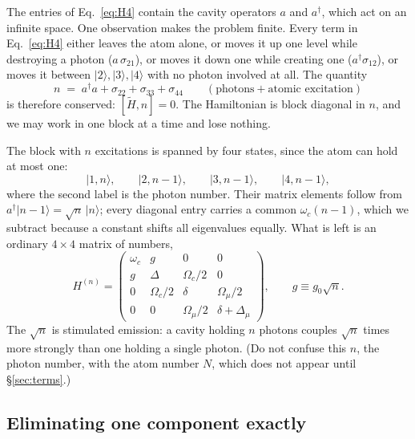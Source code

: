 \documentclass[11pt,a4paper]{article}
\newcommand{\ket}[1]{\lvert #1 \rangle}
\newcommand{\dg}{^{\dagger}}
\newcommand{\Om}{\Omega}
\newcommand{\Omu}{\Omega_{\mu}}
\newcommand{\Dmu}{\Delta_{\mu}}
\begin{document}
The entries of Eq.~\eqref{eq:H4} contain the cavity operators $a$ and $a\dg$, which act on an
infinite space. One observation makes the problem finite. Every term in Eq.~\eqref{eq:H4}
either leaves the atom alone, or moves it up one level while destroying a photon
($a\,\sigma_{21}$), or moves it down one while creating one ($a\dg\sigma_{12}$), or moves it
between $\ket{2},\ket{3},\ket{4}$ with no photon involved at all. The quantity
\begin{equation}
  n \;=\; a\dg a + \sigma_{22}+\sigma_{33}+\sigma_{44}
  \qquad(\text{photons} + \text{atomic excitation})
  \label{eq:nexc}
\end{equation}
is therefore conserved: $[\tilde H, n]=0$. The Hamiltonian is block diagonal in $n$, and we may
work in one block at a time and lose nothing.

The block with $n$ excitations is spanned by four states, since the atom can hold at most one:
\begin{equation}
  \ket{1,n},\qquad \ket{2,n\!-\!1},\qquad \ket{3,n\!-\!1},\qquad \ket{4,n\!-\!1},
\end{equation}
where the second label is the photon number. Their matrix elements follow from
$a\dg\ket{n\!-\!1}=\sqrt n\,\ket{n}$; every diagonal entry carries a common
$\omega_c(n\!-\!1)$, which we subtract because a constant shifts all eigenvalues equally. What
is left is an ordinary $4\times4$ matrix of numbers,
\begin{equation}
  H^{(n)}=\begin{pmatrix}
    \omega_c & g & 0 & 0\\
    g & \Delta & \Om_c/2 & 0\\
    0 & \Om_c/2 & \delta & \Omu/2\\
    0 & 0 & \Omu/2 & \delta+\Dmu
  \end{pmatrix},
  \qquad g \equiv g_0\sqrt n .
  \label{eq:Hn}
\end{equation}
The $\sqrt n$ is stimulated emission: a cavity holding $n$ photons couples $\sqrt n$ times more
strongly than one holding a single photon. (Do not confuse this $n$, the photon number, with the
atom number $N$, which does not appear until \S\ref{sec:terms}.)

\subsection{Eliminating one component exactly}
\end{document}

